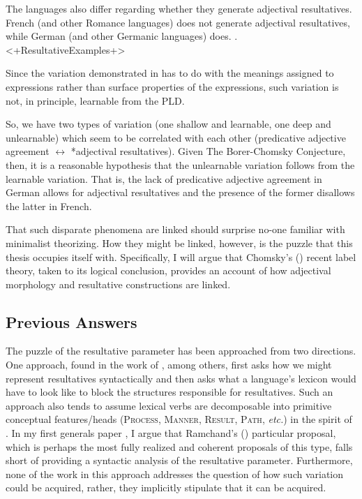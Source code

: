 \documentclass[letterpaper,12pt]{article}
\begin{document}
The languages also differ regarding whether they generate adjectival resultatives.
French (and other Romance languages) does not generate adjectival resultatives, while German (and other Germanic languages) does.
\ex. <+ResultativeExamples+> 

Since the variation demonstrated in \Last has to do with the meanings assigned to expressions rather than surface properties of the expressions, such variation is not, in principle, learnable from the PLD.

So, we have two types of variation (one shallow and learnable, one deep and unlearnable) which seem to be correlated with each other (predicative adjective agreement $\leftrightarrow$ *adjectival resultatives).
Given The Borer-Chomsky Conjecture, then, it is a reasonable hypothesis that the unlearnable variation follows from the learnable variation.
That is, the lack of predicative adjective agreement in German allows for adjectival resultatives and the presence of the former disallows the latter in French.

That such disparate phenomena are linked should surprise no-one familiar with minimalist theorizing.
How they might be linked, however, is the puzzle that this thesis occupies itself with.
Specifically, I will argue that Chomsky's (\citeyear{chomsky2013problems,chomsky2015problems}) recent label theory, taken to its logical conclusion, provides an account of how adjectival morphology and resultative constructions are linked.


\subsection{Previous Answers}
The puzzle of the resultative parameter has been approached from two directions.
One approach, found in the work of \textcite{harley2005how,folli2006licensing,ramchand2008verb,tungseth2008verbal}, among others, first asks how we might represent resultatives syntactically and then asks what a language's lexicon would have to look like to block the structures responsible for resultatives.
Such an approach also tends to assume lexical verbs are decomposable into primitive conceptual features/heads (\textsc{Process}, \textsc{Manner}, \textsc{Result}, \textsc{Path}, \textit{etc.}) in the spirit of \textcite{hale1993argument}.
In my first generals paper \parencite[][pp 30-32]{milway2015generals}, I argue that Ramchand's (\citeyear{ramchand2008verb}) particular proposal, which is perhaps the most fully realized and coherent proposals of this type, falls short of providing a syntactic analysis of the resultative parameter.
Furthermore, none of the work in this approach addresses the question of how such variation could be acquired, rather, they implicitly stipulate that it can be acquired.
\end{document}
